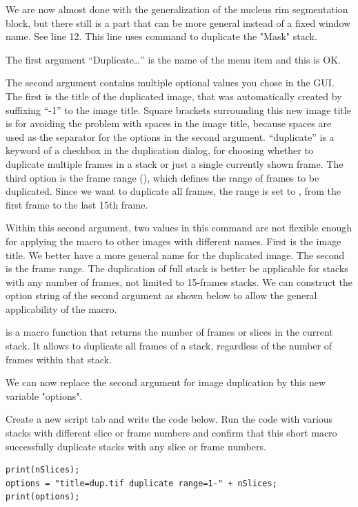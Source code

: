 We are now almost done with the generalization of the nucleus rim segmentation block, but there still is a part that can be more general instead of a fixed window name. See line 12. This line uses  command to duplicate the "Mask" stack. 


The first argument ``Duplicate\ldots'' is the name of the menu item  and this is OK. 

The second argument contains multiple optional values you chose in the GUI. The first is the title of the duplicated image, that was automatically created by suffixing ``-1'' to the image title. Square brackets surrounding this new image title is for avoiding the problem with spaces in the image title, because spaces are used as the separator for the options in the second argument. ``duplicate'' is a keyword of a checkbox in the duplication dialog, for choosing whether to duplicate multiple frames in a stack or just a single currently shown frame. The third option is the frame range (), which defines the range of frames to be duplicated. Since we want to duplicate all frames, the range is set to , from the first frame to the last 15th frame.

Within this second argument, two values in this command are not flexible enough for applying the macro to other images with different names. First is the image title. We better have a more general name for the duplicated image. The second is the frame range. The duplication of full stack is better be applicable for stacks with any number of frames, not limited to 15-frames stacks. 
We can construct the option string of the second argument as shown below to allow the general applicability of the macro. 


 is a macro function that returns the number of frames or slices in the current stack. It allows to duplicate all frames of a stack, regardless of the number of frames within that stack. 

We can now replace the second argument for image duplication by this new variable "options". 


\begin{indentexercise}{2}
Create a new script tab and write the code below. Run the code with various stacks with different slice or frame numbers and confirm that this short macro successfully duplicate stacks with any slice or frame numbers. 
\begin{lstlisting}
print(nSlices);
options = "title=dup.tif duplicate range=1-" + nSlices;
print(options);
\end{lstlisting}
\end{indentexercise}

